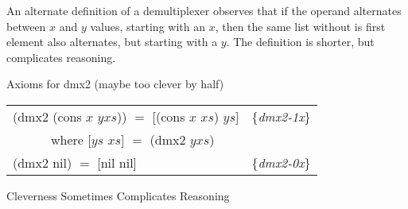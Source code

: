 \begin{aside}
An alternate definition of a demultiplexer
observes that if the operand alternates between $x$ and $y$ values,
starting with an $x$,
then the same list without is first element also alternates,
but starting with a $y$. The definition is shorter,
but complicates reasoning.\\
\begin{center}
Axioms for \textsf{dmx2} (maybe too clever by half)
\begin{tabular}{ll}
\textsf{(dmx2 (cons $x$ $yxs$)) $=$ [(cons $x$ $xs$) $ys$]}& \{\emph{dmx2-1x}\} \\
~~~~~~where \textsf{[$ys$ $xs$] $=$ (dmx2 $yxs$)}          & \\
\textsf{(dmx2 nil) $=$ [nil nil] }                         & \{\emph{dmx2-0x}\} \\
\end{tabular}
\end{center}
\caption{Cleverness Sometimes Complicates Reasoning}
\label{aside:dmx-defun-trick}
\end{aside} 